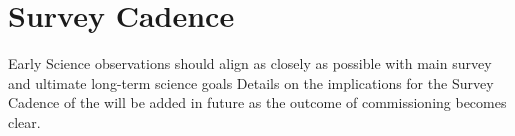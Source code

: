 \section{Survey Cadence}

Early Science observations should align as closely as possible with main survey and ultimate long-term science goals
Details on the implications for the Survey Cadence of the \esp will be added in future as the outcome of commissioning becomes clear.  

